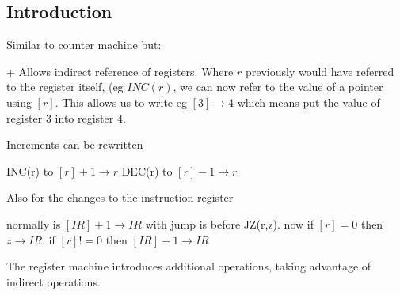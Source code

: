 
\subsection{Introduction}

Similar to counter machine but:

+ Allows indirect reference of registers. Where \(r\) previously would have referred to the register itself, (eg \(INC(r)\), we can now refer to the value of a pointer using \([r]\). This allows us to write eg \([3]\rightarrow 4\) which means put the value of register \(3\) into register \(4\).

Increments can be rewritten

INC(r) to \([r]+1\rightarrow r\)
DEC(r) to \([r]-1\rightarrow r\)

Also for the changes to the instruction register

normally is \([IR]+1\rightarrow IR\)
with jump is before JZ(r,z). now if \([r]=0\) then \(z\rightarrow IR\). if \([r]!=0\) then \([IR]+1\rightarrow IR\)

The register machine introduces additional operations, taking advantage of indirect operations.

